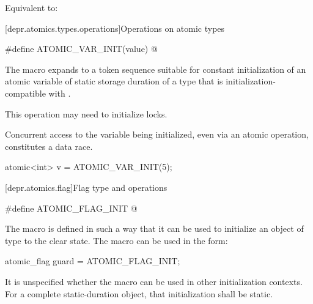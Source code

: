 \begin{itemdescr}
\pnum
\effects
Equivalent to: 
\end{itemdescr}

[depr.atomics.types.operations]{Operations on atomic types}

%
\begin{itemdecl}
#define ATOMIC_VAR_INIT(value) @\seebelow@
\end{itemdecl}

\begin{itemdescr}
\pnum
The macro expands to a token sequence suitable for constant initialization of
an atomic variable of static storage duration of a type that
is initialization-compatible with .
\begin{note}
This operation may need to initialize locks.
\end{note}
Concurrent access to the variable being initialized,
even via an atomic operation,
constitutes a data race.
\begin{example}
\begin{codeblock}
atomic<int> v = ATOMIC_VAR_INIT(5);
\end{codeblock}
\end{example}
\end{itemdescr}

[depr.atomics.flag]{Flag type and operations}

%
\begin{itemdecl}
#define ATOMIC_FLAG_INIT @\seebelow@
\end{itemdecl}

\begin{itemdescr}
\pnum
\remarks
The macro  is defined in such a way that
it can be used to initialize an object of type 
to the clear state.
The macro can be used in the form:
\begin{codeblock}
atomic_flag guard = ATOMIC_FLAG_INIT;
\end{codeblock}
It is unspecified whether the macro can be used
in other initialization contexts.
For a complete static-duration object, that initialization shall be static.
\end{itemdescr}
